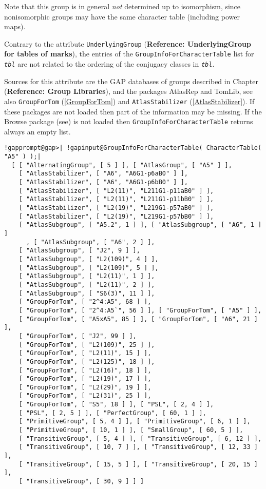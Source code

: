 \documentclass[a4paper,11pt]{report}
\begin{document}
{{{ Note that this group is in general \emph{not} determined up to isomorphism, since nonisomorphic groups may have the same
character table (including power maps). 

 Contrary to the attribute \texttt{UnderlyingGroup} (\textbf{Reference: UnderlyingGroup for tables of marks}), the entries of the \texttt{GroupInfoForCharacterTable} list for \mbox{\texttt{\mdseries\slshape tbl}} are not related to the ordering of the conjugacy classes in \mbox{\texttt{\mdseries\slshape tbl}}. 

 Sources for this attribute are the \textsf{GAP} databases of groups described in Chapter  (\textbf{Reference: Group Libraries}), and the packages \textsf{AtlasRep} and \textsf{TomLib}, see also \texttt{GroupForTom} (\ref{GroupForTom}) and \texttt{AtlasStabilizer} (\ref{AtlasStabilizer}). If these packages are not loaded then part of the information may be
missing. If the \textsf{Browse} package (see{\nobreakspace}\cite{Browse}) is not loaded then \texttt{GroupInfoForCharacterTable} returns always an empty list. 

 
\begin{Verbatim}[commandchars=!@|,fontsize=\small,frame=single,label=Example]
  !gapprompt@gap>| !gapinput@GroupInfoForCharacterTable( CharacterTable( "A5" ) );|
  [ [ "AlternatingGroup", [ 5 ] ], [ "AtlasGroup", [ "A5" ] ], 
    [ "AtlasStabilizer", [ "A6", "A6G1-p6aB0" ] ], 
    [ "AtlasStabilizer", [ "A6", "A6G1-p6bB0" ] ], 
    [ "AtlasStabilizer", [ "L2(11)", "L211G1-p11aB0" ] ], 
    [ "AtlasStabilizer", [ "L2(11)", "L211G1-p11bB0" ] ], 
    [ "AtlasStabilizer", [ "L2(19)", "L219G1-p57aB0" ] ], 
    [ "AtlasStabilizer", [ "L2(19)", "L219G1-p57bB0" ] ], 
    [ "AtlasSubgroup", [ "A5.2", 1 ] ], [ "AtlasSubgroup", [ "A6", 1 ] ]
      , [ "AtlasSubgroup", [ "A6", 2 ] ], 
    [ "AtlasSubgroup", [ "J2", 9 ] ], 
    [ "AtlasSubgroup", [ "L2(109)", 4 ] ], 
    [ "AtlasSubgroup", [ "L2(109)", 5 ] ], 
    [ "AtlasSubgroup", [ "L2(11)", 1 ] ], 
    [ "AtlasSubgroup", [ "L2(11)", 2 ] ], 
    [ "AtlasSubgroup", [ "S6(3)", 11 ] ], 
    [ "GroupForTom", [ "2^4:A5", 68 ] ], 
    [ "GroupForTom", [ "2^4:A5`", 56 ] ], [ "GroupForTom", [ "A5" ] ], 
    [ "GroupForTom", [ "A5xA5", 85 ] ], [ "GroupForTom", [ "A6", 21 ] ],
    [ "GroupForTom", [ "J2", 99 ] ], 
    [ "GroupForTom", [ "L2(109)", 25 ] ], 
    [ "GroupForTom", [ "L2(11)", 15 ] ], 
    [ "GroupForTom", [ "L2(125)", 18 ] ], 
    [ "GroupForTom", [ "L2(16)", 18 ] ], 
    [ "GroupForTom", [ "L2(19)", 17 ] ], 
    [ "GroupForTom", [ "L2(29)", 19 ] ], 
    [ "GroupForTom", [ "L2(31)", 25 ] ], 
    [ "GroupForTom", [ "S5", 18 ] ], [ "PSL", [ 2, 4 ] ], 
    [ "PSL", [ 2, 5 ] ], [ "PerfectGroup", [ 60, 1 ] ], 
    [ "PrimitiveGroup", [ 5, 4 ] ], [ "PrimitiveGroup", [ 6, 1 ] ], 
    [ "PrimitiveGroup", [ 10, 1 ] ], [ "SmallGroup", [ 60, 5 ] ], 
    [ "TransitiveGroup", [ 5, 4 ] ], [ "TransitiveGroup", [ 6, 12 ] ], 
    [ "TransitiveGroup", [ 10, 7 ] ], [ "TransitiveGroup", [ 12, 33 ] ],
    [ "TransitiveGroup", [ 15, 5 ] ], [ "TransitiveGroup", [ 20, 15 ] ],
    [ "TransitiveGroup", [ 30, 9 ] ] ]
\end{Verbatim}
 }

}}
\end{document}
